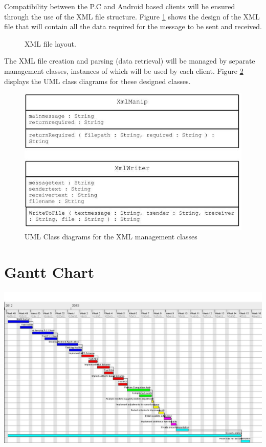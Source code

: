 \documentclass[a4paper,10pt]{report}
\begin{document}
Compatibility between the P.C and Android based clients will be ensured through the use of the XML file structure. Figure \ref{fig:xmldesign} shows the design of the XML file that will contain all the data required for the message to be sent and received.  

\begin{figure}[htb]
\centering

\caption{XML file layout.}
\label{fig:xmldesign}
\end{figure}

The XML file creation and parsing (data retrieval) will be managed by separate management classes, instances of which will be used by each client. Figure \ref{fig:xmlclass} displays the UML class diagrams for these designed classes.

\begin{figure}[htb]
\centering
\includegraphics[scale=0.4]{images/xmlclass.jpg}
\caption{UML Class diagrams for the XML management classes}
\label{fig:xmlclass}
\end{figure}

\appendix
\chapter{Gantt Chart}\label{A}
\includegraphics[scale=0.35, angle=270]{images/ProgReportChart.jpg}


\end{document}
